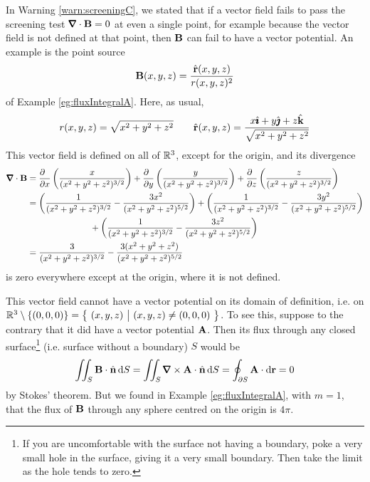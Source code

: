 \begin{eg}\label{eg:stokesE}
In Warning \ref{warn:screeningC}, we stated that if a vector field
fails to pass the screening test $\vnabla\cdot\vB=0$ at even a single 
point, for example because the vector field is not defined at that point, 
then $\mathbf{B}$ can fail to have a vector potential.
An example is the point source
\begin{equation*}
\mathbf{B}(x,y,z) = \frac{\hat{\mathbf{r}}(x,y,z)}{r(x,y,z)^2}
\end{equation*}
of Example \ref{eg:fluxIntegralA}. Here, as usual,
\begin{equation*}
r(x,y,z) = \sqrt{x^2+y^2+z^2}\qquad
\hat{\mathbf{r}}(x,y,z) = \frac{x\hat{\pmb{\imath}} + y\hat{\pmb{\jmath}} + z\hat{\mathbf{k}}}{\sqrt{x^2+y^2+z^2}}
\end{equation*}
This vector field is defined on all of $\mathbb{R}^3$, except for the origin, and
its divergence 
\begin{align*}
\vnabla\cdot\vB
&=\frac{\partial\hfill}{\partial x} \left(\frac{x}{(x^2+y^2+z^2)^{3/2}}\right)
  +\frac{\partial\hfill}{\partial y} \left(\frac{y}{(x^2+y^2+z^2)^{3/2}}\right)
  +\frac{\partial\hfill}{\partial z} \left(\frac{z}{(x^2+y^2+z^2)^{3/2}}\right)
\\
&=\left(\frac{1}{(x^2+y^2+z^2)^{3/2}}-\frac{3x^2}{(x^2+y^2+z^2)^{5/2}}\right)
+\left(\frac{1}{(x^2+y^2+z^2)^{3/2}}-\frac{3y^2}{(x^2+y^2+z^2)^{5/2}}\right)
\\&\hskip1in
+\left(\frac{1}{(x^2+y^2+z^2)^{3/2}}-\frac{3z^2}{(x^2+y^2+z^2)^{5/2}}\right)
\\
&=\frac{3}{(x^2+y^2+z^2)^{3/2}}-\frac{3(x^2+y^2+z^2)}{(x^2+y^2+z^2)^{5/2}}
\end{align*}
is zero everywhere except at the origin, where it is not defined.

This vector field cannot have a vector potential on its 
domain of definition, i.e. on
$
\mathbb{R}^3\setminus\{(0,0,0)\}
             =\big\{ \ (x,y,z)\ \big|\ (x,y,z)\ne(0,0,0)\ \big\}
$. To see this, suppose to the contrary that it did have a vector potential
$\mathbf{A}$. Then its flux through any closed surface\footnote{If you are uncomfortable with the surface not having a boundary, poke a very small hole
in the surface, giving it a very small boundary. Then take the limit as the hole tends to zero.} (i.e. surface without a boundary) $S$ would be
\begin{align*}
\dblInt_S\vB\cdot\hn\,\dee{S}
     = \dblInt_S\vnabla\times\vA\cdot\hn\,\dee{S}
     =\oint_{\partial S}\vA\cdot\dee{\vr}
     =0
\end{align*}
by Stokes' theorem. But we found in Example \ref{eg:fluxIntegralA}, 
with $m=1$, that the flux of $\mathbf{B}$ through any sphere centred on 
the origin is $4\pi$.

\end{eg}

